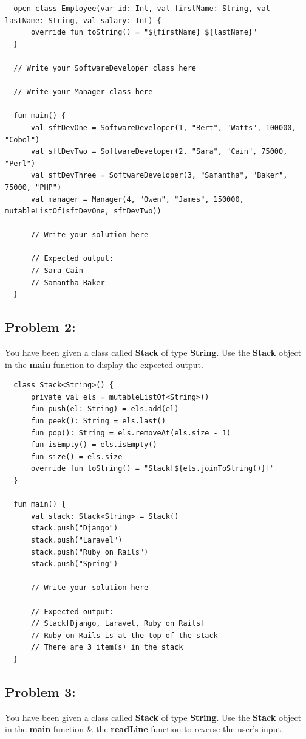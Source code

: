 \documentclass{article}
\begin{document}
\begin{verbatim}
  open class Employee(var id: Int, val firstName: String, val lastName: String, val salary: Int) {
      override fun toString() = "${firstName} ${lastName}"
  }

  // Write your SoftwareDeveloper class here

  // Write your Manager class here

  fun main() {
      val sftDevOne = SoftwareDeveloper(1, "Bert", "Watts", 100000, "Cobol")
      val sftDevTwo = SoftwareDeveloper(2, "Sara", "Cain", 75000, "Perl")
      val sftDevThree = SoftwareDeveloper(3, "Samantha", "Baker", 75000, "PHP")
      val manager = Manager(4, "Owen", "James", 150000, mutableListOf(sftDevOne, sftDevTwo))

      // Write your solution here

      // Expected output:
      // Sara Cain
      // Samantha Baker
  }
\end{verbatim}

\subsection*{Problem 2:}
You have been given a class called \textbf{Stack} of type \textbf{String}. Use the \textbf{Stack} object in the \textbf{main} function to display the expected output.

\begin{verbatim}
  class Stack<String>() {
      private val els = mutableListOf<String>()
      fun push(el: String) = els.add(el)
      fun peek(): String = els.last()
      fun pop(): String = els.removeAt(els.size - 1)
      fun isEmpty() = els.isEmpty()
      fun size() = els.size
      override fun toString() = "Stack[${els.joinToString()}]"
  }

  fun main() {
      val stack: Stack<String> = Stack()
      stack.push("Django")
      stack.push("Laravel")
      stack.push("Ruby on Rails")
      stack.push("Spring")

      // Write your solution here

      // Expected output:
      // Stack[Django, Laravel, Ruby on Rails]
      // Ruby on Rails is at the top of the stack
      // There are 3 item(s) in the stack
  }
\end{verbatim}

\subsection*{Problem 3:}
You have been given a class called \textbf{Stack} of type \textbf{String}. Use the \textbf{Stack} object in the \textbf{main} function \& the \textbf{readLine} function to reverse the user's input.
\end{document}
